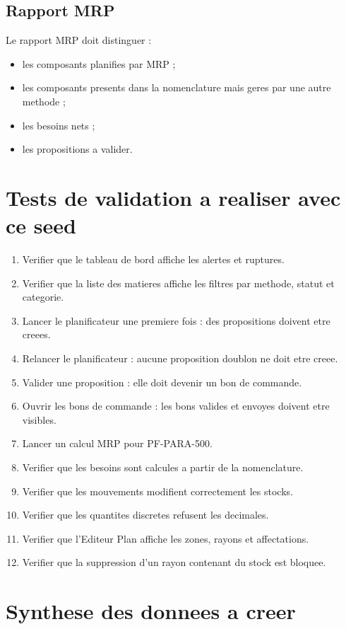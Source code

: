 \documentclass[11pt,a4paper]{article}
\begin{document}
\subsection{Rapport MRP}

Le rapport MRP doit distinguer :
\begin{itemize}
  \item les composants planifies par MRP ;
  \item les composants presents dans la nomenclature mais geres par une autre methode ;
  \item les besoins nets ;
  \item les propositions a valider.
\end{itemize}

\section{Tests de validation a realiser avec ce seed}

\begin{enumerate}
  \item Verifier que le tableau de bord affiche les alertes et ruptures.
  \item Verifier que la liste des matieres affiche les filtres par methode, statut et categorie.
  \item Lancer le planificateur une premiere fois : des propositions doivent etre creees.
  \item Relancer le planificateur : aucune proposition doublon ne doit etre creee.
  \item Valider une proposition : elle doit devenir un bon de commande.
  \item Ouvrir les bons de commande : les bons valides et envoyes doivent etre visibles.
  \item Lancer un calcul MRP pour PF-PARA-500.
  \item Verifier que les besoins sont calcules a partir de la nomenclature.
  \item Verifier que les mouvements modifient correctement les stocks.
  \item Verifier que les quantites discretes refusent les decimales.
  \item Verifier que l'Editeur Plan affiche les zones, rayons et affectations.
  \item Verifier que la suppression d'un rayon contenant du stock est bloquee.
\end{enumerate}

\section{Synthese des donnees a creer}
\end{document}
